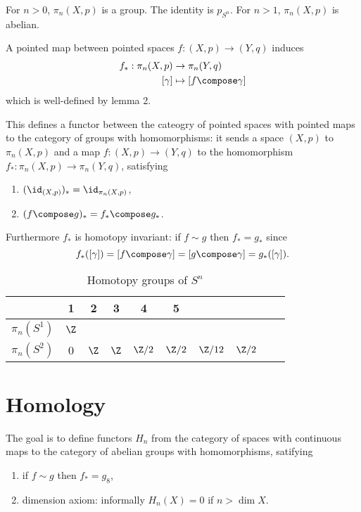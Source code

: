 \documentclass[a4paper]{article}
\begin{document}
For \(n > 0\), \(\pi_n(X, p)\) is a group. The identity is \(p_{S^n}\). For \(n > 1\), \(\pi_n(X, p)\) is abelian.

A pointed map between pointed spaces \(f: (X, p) \to (Y, q)\) induces
\begin{align*}
  f_*: \pi_n(X, p) &\to \pi_n(Y, q) \\
  [\gamma] &\mapsto [f \compose \gamma]
\end{align*}
which is well-defined by lemma 2.

This defines a functor between the cateogry of pointed spaces with pointed maps to the category of groups with homomorphisms: it sends a space \((X, p)\) to \(\pi_n(X, p)\) and a map \(f: (X, p) \to (Y, q)\) to the homomorphism \(f_*: \pi_n(X, p) \to \pi_n(Y, q)\), satisfying
\begin{enumerate}
\item \((\id_{(X, p)})_* = \id_{\pi_n(X, p)}\),
\item \((f \compose g)_* = f_* \compose g_*\).
\end{enumerate}
Furthermore \(f_*\) is homotopy invariant: if \(f \sim g\) then \(f_* = g_*\) since
\[
  f_*([\gamma]) = [f \compose \gamma] = [g \compose \gamma] = g_*([\gamma]).
\]

\begin{eg}
  \begin{table}[ht]
    \centering
    \begin{tabular}{c|c|c|c|c|c|c|c|c|c}
      & 1 & 2 & 3 & 4 & 5 \\ \hline
      \(\pi_n(S^1)\) & \(\Z\) &&&&&& \\ \hline
      \(\pi_n(S^2)\) & \(0\) & \(\Z\) & \(\Z\) & \(\Z/2\) & \(\Z/2\) & \(\Z/12\) &\(\Z/2\)
    \end{tabular}
    \caption{Homotopy groups of \(S^n\)}
  \end{table}
\end{eg}

\section{Homology}

The goal is to define functors \(H_n\) from the category of spaces with continuous maps to the category of abelian groups with homomorphisms, satifying
\begin{enumerate}
\item if \(f \sim g\) then \(f_* = g_8\),
\item dimension axiom: informally \(H_n(X) = 0\) if \(n > \dim X\).
\end{enumerate}
\end{document}
